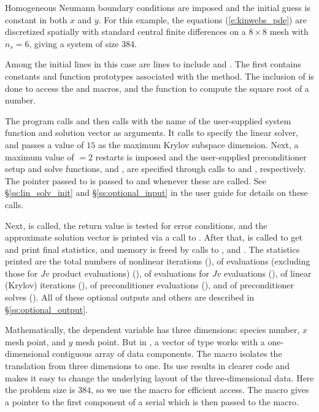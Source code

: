Homogeneous Neumann boundary conditions are imposed and the initial
guess is constant in both $x$ and $y$. For this example, the equations
(\ref{e:kinwebs_pde}) are discretized spatially with standard central finite
differences on a $8 \times 8$ mesh with $n_s = 6$, giving a system of size $384$.

Among the initial  lines in this case are lines to
include  and .  The first contains
constants and function prototypes associated with the {\spgmr} method.
The inclusion of  is done to access the  and
 macros, and the  function to compute the square root
of a  number.

The  program calls  and then calls  with the
name of the user-supplied system function  and solution vector as
arguments. It calls   to specify the {\kinspgmr} linear solver, and
passes a  value of $15$ as the maximum Krylov subspace dimension.
Next, a maximum value of  $=2$ restarts is imposed and
the user-supplied preconditioner setup and solve functions,  and
, are specified through calls to  and
, respectively. The  pointer passed to
 is passed to  and  whenever
these are called. See \S\ref{ss:lin_solv_init} and \S\ref{ss:optional_input} in
the user guide for details on these calls.

Next,  is called, the return value is tested for error conditions, and
the approximate solution vector is printed via a call to .
After that,  is called to get and print final statistics, and
memory is freed by calls to ,  and .
The statistics printed are the total numbers of nonlinear iterations (),
of  evaluations (excluding those for $Jv$ product evaluations) (),
of  evaluations for $Jv$ evaluations (), of linear (Krylov)
iterations (), of preconditioner evaluations (), and of
preconditioner solves (). All of these optional outputs and others are
described in \S\ref{ss:optional_output}.

Mathematically, the dependent variable has three dimensions: species
number, $x$ mesh point, and $y$ mesh point.  But in {\nvecs}, a vector of
type  works with a one-dimensional contiguous array of
data components. The macro  isolates the translation from
three dimensions to one. Its use results in clearer code and makes it
easy to change the underlying layout of the three-dimensional data. 
Here the problem size is $384$, so we use the  macro
for efficient  access. The  macro gives
a pointer to the first component of a serial  which is then
passed to the  macro.

